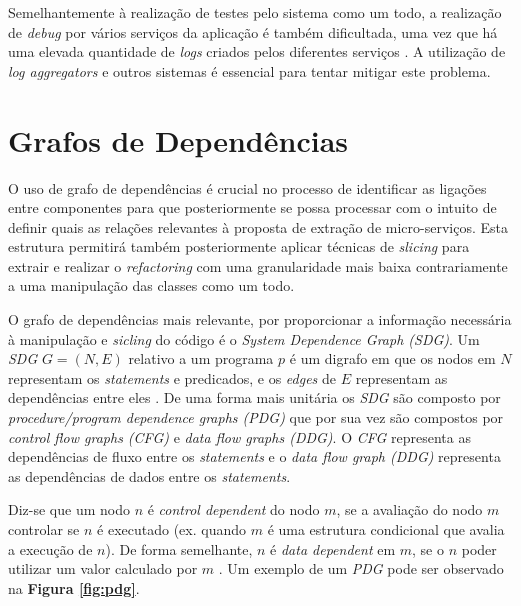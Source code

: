     Semelhantemente à realização de testes pelo sistema como um todo, a realização de \textit{debug} por vários serviços da aplicação é também dificultada, uma vez que há uma elevada quantidade de \textit{logs} criados pelos diferentes serviços \citep{nemer_19_summary}. A utilização de \textit{log aggregators} e outros sistemas é essencial para tentar mitigar este problema.
    
    
    
\section{Grafos de Dependências}

    O uso de grafo de dependências é crucial no processo de identificar as ligações entre componentes para que posteriormente se possa processar com o intuito de definir quais as relações relevantes à proposta de extração de micro-serviços. Esta estrutura permitirá também posteriormente aplicar técnicas de \textit{slicing} para extrair e realizar o \textit{refactoring} com uma granularidade mais baixa contrariamente a uma manipulação das classes como um todo.
    
    O grafo de dependências mais relevante, por proporcionar a informação necessária à manipulação e \textit{sicling} do código é o \textit{System Dependence Graph (SDG)}. Um \textit{SDG} $G = (N,E)$ relativo a um programa $p$ é um digrafo em que os nodos em $N$ representam os \textit{statements} e predicados, e os \textit{edges} de $E$ representam as dependências entre eles \citep{graf10_sdg_generation, horwitz04_inter_procedural_slicing}. 
    De uma forma mais unitária os \textit{SDG} são composto por \textit{procedure/program dependence graphs (PDG)} que por sua vez são compostos por \textit{control flow graphs (CFG)} e \textit{data flow graphs (DDG)}. O \textit{CFG} representa as dependências de fluxo entre os \textit{statements} e o \textit{data flow graph (DDG)} representa as dependências de dados entre os \textit{statements}.
    
    Diz-se que um nodo $n$ é \textit{control dependent} do nodo $m$, se a avaliação do nodo $m$ controlar se $n$ é executado (ex. quando $m$ é uma estrutura condicional que avalia a execução de $n$). De forma semelhante, $n$ é \textit{data dependent} em $m$, se o $n$ poder utilizar um valor calculado por $m$ \citep{graf10_sdg_generation}. Um exemplo de um \textit{PDG} pode ser observado na \textbf{Figura \ref{fig:pdg}}.
    
